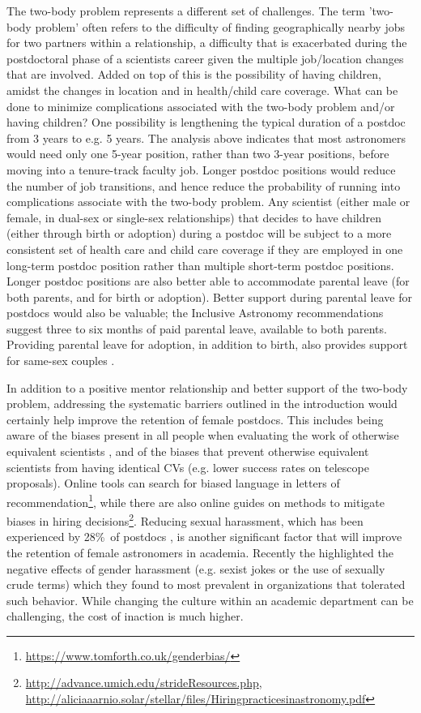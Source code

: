 \documentclass[modern]{aastex62}
\begin{document}
The two-body problem represents a different set of challenges. The term 'two-body problem' often refers to the difficulty of finding geographically nearby jobs for two partners within a relationship, a difficulty that is exacerbated during the postdoctoral phase of a scientists career given the multiple job/location changes that are involved. Added on top of this is the possibility of having children, amidst the changes in location and in health/child care coverage. What can be done to minimize complications associated with the two-body problem and/or having children? One possibility is lengthening the typical duration of a postdoc from 3 years to e.g. 5 years. The analysis above indicates that most astronomers would need only one 5-year position, rather than two 3-year positions, before moving into a tenure-track faculty job. Longer postdoc positions would reduce the number of job transitions, and hence reduce the probability of running into complications associate with the two-body problem. Any scientist (either male or female, in dual-sex or single-sex relationships) that decides to have children (either through birth or adoption) during a postdoc will be subject to a more consistent set of health care and child care coverage if they are employed in one long-term postdoc position rather than multiple short-term postdoc positions. Longer postdoc positions are also better able to accommodate parental leave (for both parents, and for birth or adoption). Better support during parental leave for postdocs would also be valuable; the Inclusive Astronomy recommendations suggest three to six months of paid parental leave, available to both parents. Providing parental leave for adoption, in addition to birth, also provides support for same-sex couples \citep{ath16}.

In addition to a positive mentor relationship and better support of the two-body problem, addressing the systematic barriers outlined in the introduction would certainly help improve the retention of female postdocs. This includes being aware of the biases present in all people when evaluating the work of otherwise equivalent scientists \citep{ste99,mos12,riv17}, and of the biases that prevent otherwise equivalent scientists from having identical CVs (e.g. lower success rates on telescope proposals). Online tools can search for biased language in letters of recommendation\footnote{\url{https://www.tomforth.co.uk/genderbias/}}, while there are also online guides on methods to mitigate biases in hiring decisions\footnote{\url{http://advance.umich.edu/strideResources.php}, \url{http://aliciaaarnio.solar/stellar/files/Hiringpracticesinastronomy.pdf}}. Reducing sexual harassment, which has been experienced by 28\%\ of postdocs \citep{sle17}, is another significant factor that will improve the retention of female astronomers in academia. Recently the \citet{nat18} highlighted the negative effects of gender harassment (e.g. sexist jokes or the use of sexually crude terms) which they found to most prevalent in organizations that tolerated such behavior. While changing the culture within an academic department can be challenging, the cost of inaction is much higher. 
\end{document}
